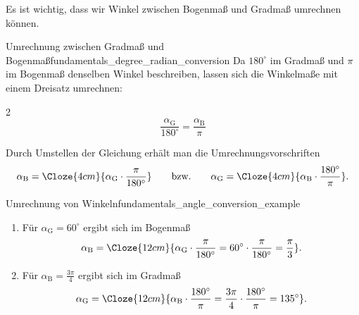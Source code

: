 \clearpage
Es ist wichtig, dass wir Winkel zwischen Bogenmaß und Gradmaß umrechnen können.
\begin{KeyPointBox}{Umrechnung zwischen Gradmaß und Bogenmaß}{fundamentals_degree_radian_conversion}
  Da $180^\circ$ im Gradmaß und $\pi$ im Bogenmaß denselben Winkel
  beschreiben, lassen sich die Winkelmaße mit einem Dreisatz umrechnen:
  \begin{ClozeArea}[8]{2}
    \[
      \frac{\alpha_{\mathrm G}}{180^\circ} =\frac{\alpha_{\mathrm B}}{\pi}
    \]
  \end{ClozeArea}
  Durch Umstellen der Gleichung erhält man die Umrechnungsvorschriften
  \[
    \alpha_{\mathrm B} = \Cloze{4cm}{\alpha_{\mathrm G}\cdot\frac{\pi}{180^\circ}}
    \qquad \text{bzw.} \qquad
    \alpha_{\mathrm G} =\Cloze{4cm}{\alpha_{\mathrm B}\cdot\frac{180^\circ}{\pi}}.
  \]
\end{KeyPointBox}

\begin{ExampleBox}{Umrechnung von Winkeln}{fundamentals_angle_conversion_example}
  \begin{enumerate}[label=\alph*)]
    \item Für $\alpha_{\mathrm G}=60^\circ$ ergibt sich im Bogenmaß
      \[
        \alpha_{\mathrm B} =
          \Cloze{12cm}{
          \alpha_{\mathrm G}\cdot\frac{\pi}{180^\circ}=60^\circ\cdot\frac{\pi}{180^\circ}=\frac{\pi}{3}
          }.
      \]
    \item Für $\alpha_{\mathrm B}=\frac{3\pi}{4}$ ergibt sich im Gradmaß
      \[
        \alpha_{\mathrm G} =
          \Cloze{12cm}{
          \alpha_{\mathrm B}\cdot\frac{180^\circ}{\pi} = \frac{3\pi}{4}\cdot\frac{180^\circ}{\pi} = 135^\circ
          }.
      \]
  \end{enumerate}
\end{ExampleBox}


